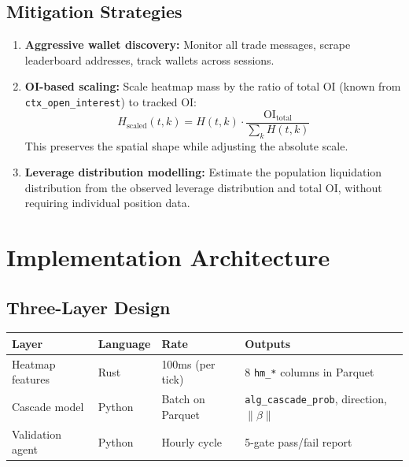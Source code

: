 \documentclass[11pt,a4paper]{article}
\begin{document}
\subsection{Mitigation Strategies}

\begin{enumerate}
    \item \textbf{Aggressive wallet discovery:} Monitor all trade messages, scrape leaderboard addresses, track wallets across sessions.
    \item \textbf{OI-based scaling:} Scale heatmap mass by the ratio of total OI (known from \texttt{ctx\_open\_interest}) to tracked OI:
    \begin{equation}
    H_{\text{scaled}}(t, k) = H(t, k) \cdot \frac{\text{OI}_{\text{total}}}{\sum_k H(t,k)}
    \end{equation}
    This preserves the spatial shape while adjusting the absolute scale.
    \item \textbf{Leverage distribution modelling:} Estimate the population liquidation distribution from the observed leverage distribution and total OI, without requiring individual position data.
\end{enumerate}

\section{Implementation Architecture}

\subsection{Three-Layer Design}

\begin{center}
\begin{tabular}{llll}
\toprule
\textbf{Layer} & \textbf{Language} & \textbf{Rate} & \textbf{Outputs} \\
\midrule
Heatmap features & Rust & 100ms (per tick) & 8 \texttt{hm\_*} columns in Parquet \\
Cascade model & Python & Batch on Parquet & \texttt{alg\_cascade\_prob}, direction, $\|\beta\|$ \\
Validation agent & Python & Hourly cycle & 5-gate pass/fail report \\
\bottomrule
\end{tabular}
\end{center}
\end{document}
